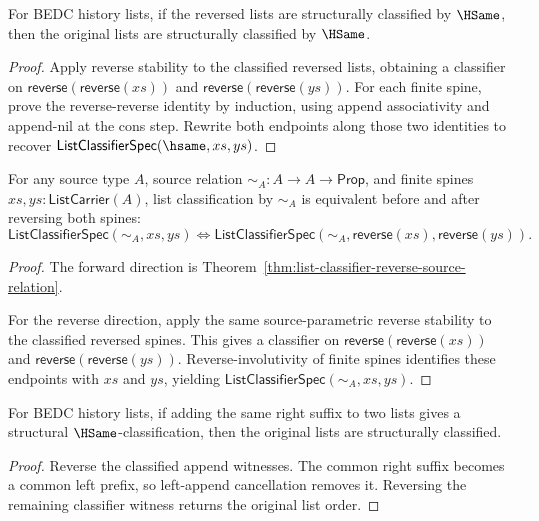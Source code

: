 \begin{theorem}
\label{thm:list-classifier-reverse-hsame-inversion}
For BEDC history lists, if the reversed lists are structurally classified by
\(\HSame\), then the original lists are structurally classified by \(\HSame\).
\end{theorem}
\begin{proof}
Apply reverse stability to the classified reversed lists, obtaining a
classifier on $\mathsf{reverse}(\mathsf{reverse}(xs))$ and
$\mathsf{reverse}(\mathsf{reverse}(ys))$. For each finite spine, prove the
reverse-reverse identity by induction, using append associativity and
append-nil at the cons step. Rewrite both endpoints along those two identities
to recover $\mathsf{ListClassifierSpec}(\hsame,xs,ys)$.
\end{proof}

\begin{theorem}
\label{thm:list-classifier-reverse-iff}
For any source type $A$, source relation
$\sim_A:A\to A\to\mathsf{Prop}$, and finite spines
$xs,ys:\mathsf{ListCarrier}(A)$, list classification by $\sim_A$ is
equivalent before and after reversing both spines:
$$
  \mathsf{ListClassifierSpec}(\sim_A,xs,ys)
  \Longleftrightarrow
  \mathsf{ListClassifierSpec}(\sim_A,\mathsf{reverse}(xs),\mathsf{reverse}(ys)).
$$
\end{theorem}
\begin{proof}
The forward direction is
Theorem~\ref{thm:list-classifier-reverse-source-relation}.

For the reverse direction, apply the same source-parametric reverse stability
to the classified reversed spines. This gives a classifier on
$\mathsf{reverse}(\mathsf{reverse}(xs))$ and
$\mathsf{reverse}(\mathsf{reverse}(ys))$. Reverse-involutivity of finite
spines identifies these endpoints with $xs$ and $ys$, yielding
$\mathsf{ListClassifierSpec}(\sim_A,xs,ys)$.
\end{proof}

\begin{theorem}
\label{thm:list-classifier-append-right-cancel-hsame}
For BEDC history lists, if adding the same right suffix to two lists gives a
structural \(\HSame\)-classification, then the original lists are structurally
classified.
\end{theorem}
\begin{proof}
Reverse the classified append witnesses. The common right suffix becomes a
common left prefix, so left-append cancellation removes it. Reversing the
remaining classifier witness returns the original list order.
\end{proof}


